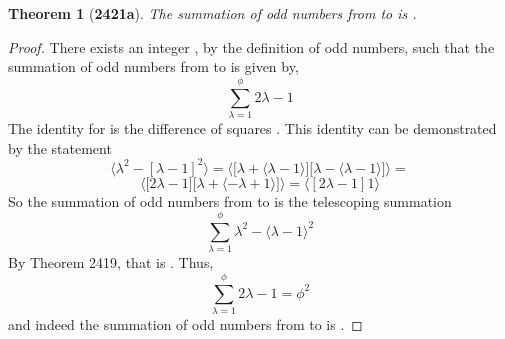 \documentclass[preview]{standalone}
\newtheorem{theorem}{Theorem}
\begin{document}
\begin{theorem}[\textbf{2421a}]
    The summation of odd numbers from  to \bm{$\phi$} is 
    .
\end{theorem}

\begin{proof}
    There exists an integer \bm{$\lambda$}, by the definition of odd numbers, such that
    the summation of odd numbers from  to \bm{$\phi$} is given by, 
    \begin{equation*}
        \sum_{\lambda=1}^\phi 
                2 \lambda - 1
    \end{equation*}
    The identity for  is the difference of squares 
    . 
    This identity can be demonstrated by the statement 
    \begin{equation*}
        \bigg \langle \lambda ^2 - [ \lambda - 1 ] ^2 \bigg \rangle
            = 
        \bigg \langle 
            \bigg[ 
                \lambda  + \langle \lambda - 1 \rangle 
            \bigg]
            \bigg[
                \lambda - \langle \lambda - 1 \rangle 
            \bigg] 
        \bigg \rangle
            =
    \end{equation*}
    \begin{equation*} 
        \bigg \langle 
            \bigg[
                2 \lambda - 1
            \bigg]
            \bigg[
                \lambda + \langle - \lambda + 1 \rangle
            \bigg]
        \bigg \rangle
            = 
        \bigg \langle [ 2 \lambda - 1 ] 1 \bigg \rangle
    \end{equation*}
    So the summation of odd numbers from  to \bm{$\phi$} 
    is the telescoping summation
    \begin{equation*}
        \sum_{\lambda=1}^\phi 
                \lambda ^2 - \langle \lambda - 1 \rangle ^2
    \end{equation*}
    By Theorem 2419, that is . 
    Thus, 
    \begin{equation*}
        \sum_{\lambda=1}^\phi 2 \lambda - 1 = \phi^2
    \end{equation*}
    and indeed the summation of odd numbers from  to \bm{$\phi$} 
    is .
\end{proof}
\end{document}
